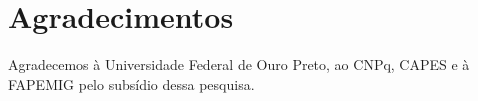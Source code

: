     
    
    
    \section*{Agradecimentos}
        Agradecemos à Universidade Federal de Ouro Preto, ao CNPq, CAPES e à FAPEMIG pelo subsídio dessa pesquisa.        

